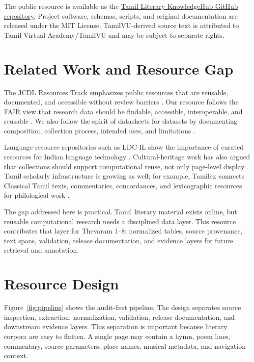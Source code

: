 \documentclass[sigconf]{acmart}
\begin{document}
The public resource is available as the \href{https://github.com/bhaveenthank/Bhaveenthan-Tamil-RAG-KnowledgeHub}{Tamil Literary KnowledgeHub GitHub repository}. Project software, schemas, scripts, and original documentation are released under the MIT License. TamilVU-derived source text is attributed to Tamil Virtual Academy/TamilVU and may be subject to separate rights.

\section{Related Work and Resource Gap}

The JCDL Resources Track emphasizes public resources that are reusable, documented, and accessible without review barriers \cite{jcdl2026resources}. Our resource follows the FAIR view that research data should be findable, accessible, interoperable, and reusable \cite{wilkinson2016fair}. We also follow the spirit of datasheets for datasets by documenting composition, collection process, intended uses, and limitations \cite{gebru2021datasheets}.

Language-resource repositories such as LDC-IL show the importance of curated resources for Indian language technology \cite{choudhary2021ldcil}. Cultural-heritage work has also argued that collections should support computational reuse, not only page-level display \cite{ziegler2020opendata}. Tamil scholarly infrastructure is growing as well; for example, Tamilex connects Classical Tamil texts, commentaries, concordances, and lexicographic resources for philological work \cite{tamilex2026}.

The gap addressed here is practical. Tamil literary material exists online, but reusable computational research needs a disciplined data layer. This resource contributes that layer for Thevaram 1--8: normalized tables, source provenance, text spans, validation, release documentation, and evidence layers for future retrieval and annotation.

\section{Resource Design}

Figure~\ref{fig:pipeline} shows the audit-first pipeline. The design separates source inspection, extraction, normalization, validation, release documentation, and downstream evidence layers. This separation is important because literary corpora are easy to flatten. A single page may contain a hymn, poem lines, commentary, source parameters, place names, musical metadata, and navigation context.
\end{document}
